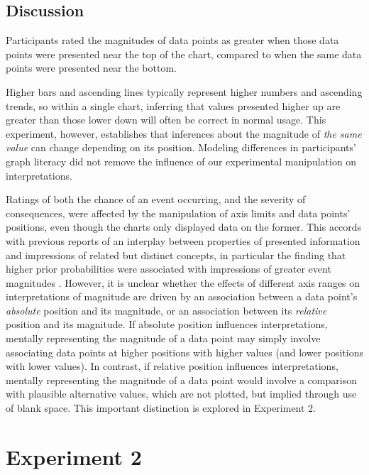 \documentclass[journal]{vgtc}                %
\begin{document}
\hypertarget{discussion}{%
\subsection{Discussion}\label{discussion}}

Participants rated the magnitudes of data points as greater when those
data points were presented near the top of the chart, compared to when
the same data points were presented near the bottom.

Higher bars and ascending lines typically represent higher numbers and
ascending trends, so within a single chart, inferring that values
presented higher up are greater than those lower down will often be
correct in normal usage. This experiment, however, establishes that
inferences about the magnitude of \emph{the same value} can change depending
on its position. Modeling differences in participants' graph literacy
did not remove the influence of our experimental manipulation on
interpretations.

Ratings of both the chance of an event occurring, and the severity of
consequences, were affected by the manipulation of axis limits and data
points' positions, even though the charts only displayed data on the
former. This accords with previous reports of an interplay between
properties of presented information and impressions of related but
distinct concepts, in particular the finding that higher prior
probabilities were associated with impressions of greater event
magnitudes \citep{kupor_probable_2020}. However, it is unclear whether the
effects of different axis ranges on interpretations of magnitude are
driven by an association between a data point's \emph{absolute} position and
its magnitude, or an association between its \emph{relative} position and its
magnitude. If absolute position influences interpretations, mentally
representing the magnitude of a data point may simply involve
associating data points at higher positions with higher values (and
lower positions with lower values). In contrast, if relative position
influences interpretations, mentally representing the magnitude of a
data point would involve a comparison with plausible alternative values,
which are not plotted, but implied through use of blank space. This
important distinction is explored in Experiment 2.

\hypertarget{experiment-2}{%
\section{Experiment 2}\label{experiment-2}}
\end{document}
